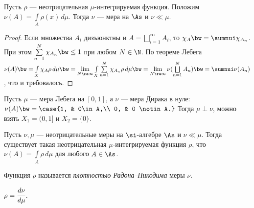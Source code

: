 \documentclass[10pt]{article}
\begin{document}
\begin{ex}
Пусть $\rho$ --- неотрицательная $\mu$-интегрируемая функция.
Положим $\nu(A)=\int\limits_A\rho(x)\,d\mu$. Тогда $\nu$ --- мера на
$\As$ и $\nu\ll\mu$.
\end{ex}

\begin{proof}
Если множества $A_i$ дизъюнктны и $A=\bigsqcup\limits_{i=1}^\infty
A_i$, то $\chi_A\bw = \sumnui\chi_{A_n}$. При этом
$\sum\limits_{n=1}^N\chi_{A_n}\bw\le 1$ при любом $N\in\N$. По
теореме Лебега $\nu(A)\bw =\int\limits_X\chi_A\rho\,d\mu\bw
=\lim\limits_{N\ra\infty} \int\limits_X\sum\limits_{n=1}^N
\chi_{A_n}\rho\,d\mu\bw =\lim\limits_{N\ra\infty}
\nu(\bigsqcup\limits_{n=1}^NA_n)\bw =\sumnui\nu(A_n)$, что и
требовалось.
\end{proof}

\begin{ex}
Пусть $\mu$ --- мера Лебега на $[0,1]$, а $\nu$ --- мера Дирака в
нуле: $\nu(A)\bw =\case{1, & 0\in A,\\ 0, & 0 \notin A.}$\; Тогда
$\mu\perp\nu$, можно взять $X_1=(0,1]$ и $X_2=\{0\}$.
\end{ex}


\begin{theorem}
Пусть $\nu,\mu$ --- неотрицательные меры на $\si$-алгебре $\As$ и
$\nu\ll\mu$. Тогда существует такая неотрицательная
$\mu$-интегрируемая функция $\rho$, что
$\nu(A)=\int\limits_A\rho\,d\mu$ для любого $A\in\As$.
\end{theorem}

\begin{note}
Функция $\rho$ называется \emph{плотностью Радона--Никодима} меры
$\nu$.
\end{note}

\begin{denote}
$\rho=\cfrac{d\nu}{d\mu}$.
\end{denote}
\end{document}
